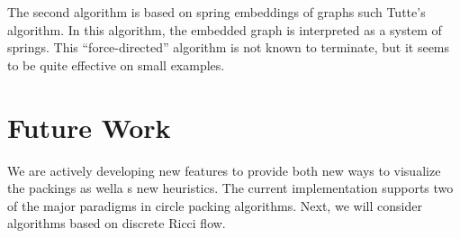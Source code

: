 \documentclass[a4paper,UKenglish]{lipics}
\begin{document}
  The second algorithm is based on spring embeddings of graphs such Tutte's algorithm.
  In this algorithm, the embedded graph is interpreted as a system of springs. 
  This ``force-directed'' algorithm is not known to terminate, but it seems to be quite effective on small examples.


\section{Future Work} %
\label{sec:future_work}

  We are actively developing new features to provide both new ways to visualize the packings as wella s new heuristics.
  The current implementation supports two of the major paradigms in circle packing algorithms.
  Next, we will consider algorithms based on discrete Ricci flow.
  
  





%
\end{document}
